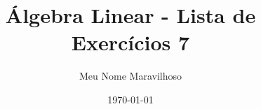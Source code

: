 \documentclass[leqno]{article}
\numberwithin{equation}{section}
\begin{document}
\newtheorem{teo}{Teorema}[section] \newtheorem*{teo*}{Teorema}
\newtheorem{prop}[teo]{Proposição} \newtheorem*{prop*}{Proposição}
\newtheorem{lema}[teo]{Lemma} \newtheorem*{lema*}{Lema}
\newtheorem{cor}[teo]{Corolário} \newtheorem*{cor*}{Corolário}

\theoremstyle{definition}
\newtheorem{defi}[teo]{Definição} \newtheorem*{defi*}{Definição}
\newtheorem{exem}[teo]{Exemplo} \newtheorem*{exem*}{Exemplo}
\newtheorem{obs}[teo]{Observação} \newtheorem*{obs*}{Observação}
\newtheorem*{hipo}{Hipóteses}
\newtheorem*{nota}{Notação}

\newcommand{\ds}{\displaystyle} \newcommand{\nl}{\newline}
\newcommand{\eps}{\varepsilon} \newcommand{\ssty}{\scriptstyle}
\newcommand{\bE}{\mathbb{E}}
\newcommand{\cB}{\mathcal{B}}
\newcommand{\cF}{\mathcal{F}}
\newcommand{\cA}{\mathcal{A}}
\newcommand{\cM}{\mathcal{M}}
\newcommand{\cD}{\mathcal{D}}
\newcommand{\cN}{\mathcal{N}}
\newcommand{\cL}{\mathcal{L}}
\newcommand{\cLN}{\mathcal{LN}}
\newcommand{\bP}{\mathbb{P}}
\newcommand{\bQ}{\mathbb{Q}}
\newcommand{\bN}{\mathbb{N}}
\newcommand{\bR}{\mathbb{R}}
\newcommand{\bZ}{\mathbb{Z}}

\newcommand{\bfw}{\mathbf{w}}
\newcommand{\bfv}{\mathbf{v}}
\newcommand{\bfu}{\mathbf{u}}
\newcommand{\bfx}{\mathbf{x}}
\newcommand{\bfb}{\mathbf{b}}

\newcommand{\bvecc}[2]{%
  \begin{bmatrix} #1 \\ #2  \end{bmatrix}
}
\newcommand{\bveccc}[3]{%
  \begin{bmatrix} #1 \\ #2 \\ #3  \end{bmatrix}
}

\newenvironment{sol}
{
    \vspace{4mm}
    \noindent\textbf{Resolução:}
    \strut\newline
    \smallskip
    \hspace{-3.5mm}
}
{}

\title{Álgebra Linear - Lista de Exercícios 7}

\author{Meu Nome Maravilhoso}

\date{\today}

\maketitle
\end{document}
